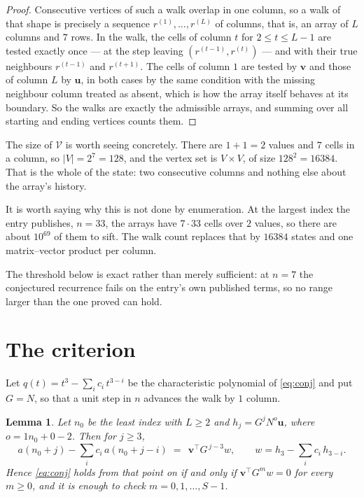 \documentclass[11pt,a4paper]{article}
\theoremstyle{plain}
\newtheorem{lemma}[theorem]{Lemma}
\theoremstyle{definition}
\begin{document}
\begin{proof}
Consecutive vertices of such a walk overlap in one column, so a walk of that shape is
precisely a sequence $r^{(1)},\dots,r^{(L)}$ of columns, that is, an array of $L$ columns
and $7$ rows. In the walk, the cells of column $t$ for $2\le t\le L-1$ are tested
exactly once --- at the step leaving $(r^{(t-1)},r^{(t)})$ --- and with their true
neighbours $r^{(t-1)}$ and $r^{(t+1)}$. The cells of column $1$ are tested by
$\mathbf{v}$ and those of column $L$ by $\mathbf{u}$, in both cases by the same condition
with the missing neighbour column treated as absent, which is how the array itself behaves at
its boundary. So the walks are exactly the admissible arrays, and summing over all starting
and ending vertices counts them.
\end{proof}


The size of $\mathcal V$ is worth seeing concretely. There are $1+1=2$ values
and $7$ cells in a column, so $|V|=2^{7}=128$, and the vertex set is
$V\times V$, of size $128^2=16384$. That is the whole of the state: two consecutive
columns and nothing else about the array's history.

It is worth saying why this is not done by enumeration. At the largest index the entry
publishes, $n=33$, the arrays have $7\cdot33$ cells over
$2$ values, so there are about $10^{69}$ of them to sift. The
walk count replaces that by $16384$ states and one matrix--vector product per column.

The threshold below is exact rather than merely sufficient: at $n=7$ the conjectured
recurrence fails on the entry's own published terms, so no range larger than the one proved
can hold.
\section{The criterion}

Let $q(t)=t^{3}-\sum_i c_i\,t^{3-i}$ be the characteristic polynomial of
\eqref{eq:conj} and put $G=N$, so that a unit step in $n$ advances the walk by
$1$ column.

\begin{lemma}\label{lem:crit}
Let $n_0$ be the least index with $L\ge2$ and $h_j=G^{j}N^{o}\mathbf{u}$, where
$o=1n_0+0-2$. Then for $j\ge3$,
\[
a(n_0+j)-\sum_i c_i\,a(n_0+j-i)\;=\;\,\mathbf{v}^{\!\top}G^{\,j-3}w,
\qquad w=h_{3}-\sum_i c_i\,h_{3-i} .
\]
Hence \eqref{eq:conj} holds from that point on if and only if
$\mathbf{v}^{\!\top}G^{m}w=0$ for every $m\ge0$, and it is enough to check
$m=0,1,\dots,S-1$.
\end{lemma}
\end{document}

